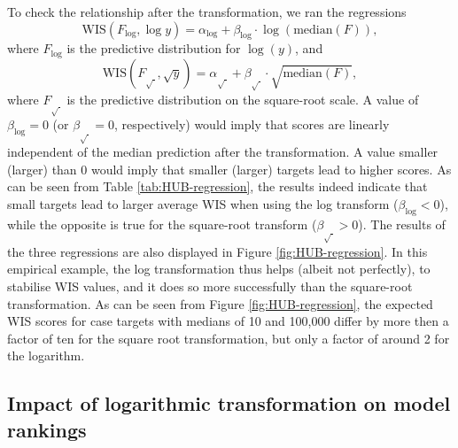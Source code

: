 \documentclass{article}
\begin{document}
To check the relationship after the transformation, we ran the regressions
\begin{equation}
    \text{WIS}(F_{\log}, \log y) = \alpha_{\log} + \beta_{\log} \cdot \log{(\text{median}(F))},
\end{equation}
where $F_{\log}$ is the predictive distribution for $\log(y)$, and
\begin{equation}
    \text{WIS}(F_{\sqrt{\ }}, \sqrt{y}) = \alpha_{\sqrt{\ }} + \beta_{\sqrt{\ }} \cdot \sqrt{\text{median}(F)},
\end{equation} 
where $F_{\sqrt{\ }}$ is the predictive distribution on the square-root scale. A value of $\beta_{\log} = 0$ (or $\beta_{\sqrt{\ }} = 0$, respectively) would imply that scores are linearly independent of the median prediction after the transformation. A value smaller (larger) than 0 would imply that smaller (larger) targets lead to higher scores. As can be seen from Table \ref{tab:HUB-regression}, the results indeed indicate that small targets lead to larger average WIS when using the log transform ($\beta_{\log} < 0$), while the opposite is true for the square-root transform ($\beta_{\sqrt{\ }} > 0$). The results of the three regressions are also displayed in Figure \ref{fig:HUB-regression}. In this empirical example, the log transformation thus helps (albeit not perfectly), to stabilise WIS values, and it does so more successfully than the square-root transformation. As can be seen from Figure \ref{fig:HUB-regression}, the expected WIS scores for case targets with medians of 10 and 100,000 differ by more then a factor of ten for the square root transformation, but only a factor of around 2 for the logarithm.

\subsection{Impact of logarithmic transformation on model rankings}
\label{sec:Hub:cor}
\end{document}
